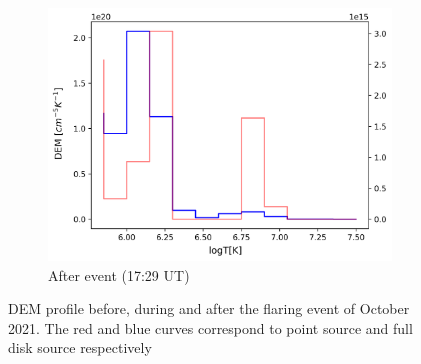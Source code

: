 \begin{figure}[h!]
\begin{subfigure}[b]{0.3\textwidth}
        \centering
        \includegraphics[width=\textwidth]{images/dem_profile_after_event_2021_oct_28.png}
        \caption{After event (17:29 UT)}
    \end{subfigure}

    \caption[DEM profile for  October 2021 event]{DEM profile before, during and after the flaring event of  October 2021. The red and blue curves correspond to point source and full disk source respectively}
    \label{fig:dem_pro_oct_28_2021}
\end{figure}


